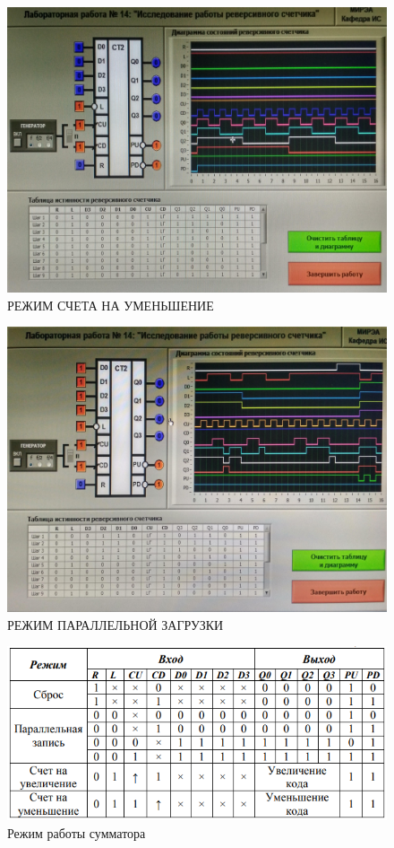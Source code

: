 \begin{figure}[H]
	\centering
	\includegraphics[width=0.95\linewidth]{imgs/14/2.jpg}
	\caption{РЕЖИМ СЧЕТА НА УМЕНЬШЕНИЕ}
	\label{fig:14_2}
\end{figure}

\begin{figure}[H]
	\centering
	\includegraphics[width=0.95\linewidth]{imgs/14/3.jpg}
	\caption{РЕЖИМ ПАРАЛЛЕЛЬНОЙ ЗАГРУЗКИ}
	\label{fig:14_3}
\end{figure}

\begin{figure}[H]
	\centering
	\includegraphics[width=0.85\linewidth]{imgs/14/14_tab}
	\caption{Режим работы сумматора}
	\label{fig:14_tab}
\end{figure}

